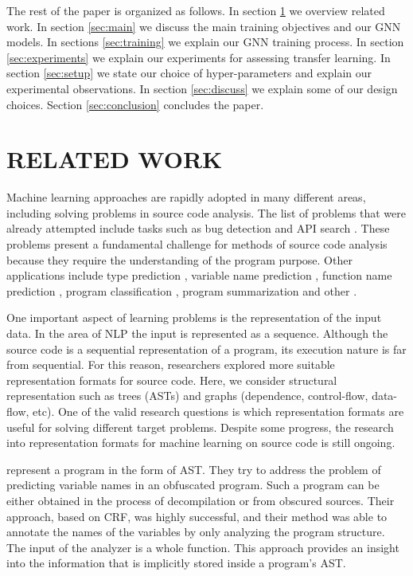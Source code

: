 \documentclass[a4paper,twoside]{article}
\begin{document}
The rest of the paper is organized as follows. In section \ref{sec:related} we overview related work. In section \ref{sec:main} we discuss the main training objectives and our GNN models. In sections \ref{sec:training} we explain our GNN training process. In section \ref{sec:experiments} we explain our experiments for assessing transfer learning. In section \ref{sec:setup} we state our choice of hyper-parameters and explain our experimental observations. In section \ref{sec:discuss} we explain some of our design choices. Section \ref{sec:conclusion} concludes the paper.

\section{\uppercase{Related Work}}\label{sec:related}

Machine learning approaches are rapidly adopted in many different areas, including solving problems in source code analysis. The list of problems that were already attempted include tasks such as bug detection \cite{Dinella2020} \cite{Wang2019} and API search \cite{Zhang2019} \cite{Wan2019}. These problems present a fundamental challenge for methods of source code analysis because they require the understanding of the program purpose. Other applications include type prediction \cite{Hellendoorn2018} \cite{Malik2019}, variable name prediction \cite{Cvitkovic2018} \cite{Bichsel2016}, function name prediction \cite{Lacomis2019} \cite{Alon2018}, program classification \cite{Ben-Nun2018} \cite{Zhou2019} \cite{Dam2019}, program summarization \cite{Fernandes2019} \cite{Shido2019} and other \cite{Nguyen2015} \cite{Yang2019} \cite{Chen2019} \cite{Drissi2018}.  

One important aspect of learning problems is the representation of the input data. In the area of NLP the input is represented as a sequence. Although the source code is a sequential representation of a program, its execution nature is far from sequential. For this reason, researchers explored more suitable representation formats for source code. Here, we consider structural representation such as trees (ASTs) and graphs (dependence, control-flow, data-flow, etc). One of the valid research questions is which representation formats are useful for solving different target problems. Despite some progress, the research into representation formats for machine learning on source code is still ongoing.

\cite{Raychev2015} represent a program in the form of AST\@. They try to address the problem of predicting variable names in an obfuscated program. Such a program can be either obtained in the process of decompilation or from obscured sources. Their approach, based on CRF, was highly successful, and their method was able to annotate the names of the variables by only analyzing the program structure. The input of the analyzer is a whole function. This approach provides an insight into the information that is implicitly stored inside a program's AST\@.
\end{document}
